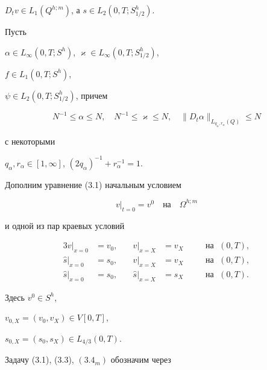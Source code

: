 $D_tv\in L_1(Q^{h;m})$, а $s\in L_2(0,T;S^h_{1/2})$.


Пусть


$\alpha\in L_\infty(0,T;S^h)$, $\varkappa\in L_\infty(0,T;S^h_{1/2})$,


$f\in L_1(0,T;S^h)$,


$\psi\in L_2(0,T;S^h_{1/2})$, причем


\begin{equation}


N^{-1}\le\alpha\le N,\quad


N^{-1}\le\varkappa\le N,\quad


\|D_t\alpha\|_{L_{q_\alpha,r_\alpha}(Q)}\le N


\end{equation}


с некоторыми


$q_\alpha,r_\alpha\in [1,\infty]$, $(2q_\alpha)^{-1}+r_\alpha^{-1}=1$.


Дополним уравнение (3.1) начальным условием


\begin{equation}


v|_{t=0}=v^0\quad\text{на}\quad\Omega^{h;m}


\end{equation}


и одной из пар краевых условий


\begin{alignat}{3}


v|_{x=0}&=v_0, &\quad


v|_{x=X}&=v_X &\quad &\text {на }\; (0,T), \tag{$3.4_1$}\\


\widehat s|_{x=0}&=s_0, &\quad


v|_{x=X}&=v_X &\quad &\text {на }\; (0,T), \tag{$3.4_2$}\\


\widehat s|_{x=0}&=s_0, &\quad


\widehat s|_{x=X}&=s_X &\quad &\text {на }\; (0,T).


\tag{$3.4_3$}


\end{alignat}


\addtocounter{equation}{1}


Здесь $v^0\in S^h$,


$v_{0,X}=(v_0,v_X)\in V[0,T]$,


$s_{0,X}=(s_0,s_X)\in L_{4/3}(0,T)$.


Задачу (3.1), (3.3), $(3.4_m)$ обозначим через


